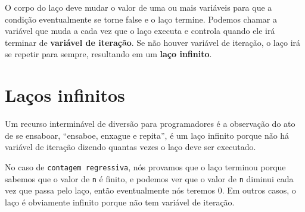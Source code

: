

O corpo do laço deve mudar o valor de uma ou mais variáveis para que a
condição eventualmente se torne false e o laço termine. Podemos chamar a
variável que muda a cada vez que o laço executa e controla quando ele irá
terminar de {\bf variável de iteração}. Se não houver variável de iteração,
o laço irá se repetir para sempre, resultando em um {\bf laço infinito}.

\section{Laços infinitos}


Um recurso interminável de diversão para programadores é a observação do ato
de se ensaboar, ``ensaboe, enxague e repita'', é um laço infinito porque não
há variável de iteração dizendo quantas vezes o laço deve ser executado.



No caso de {\tt contagem regressiva}, nós provamos que o laço terminou porque
sabemos que o valor de {\tt n} é finito, e podemos ver que o valor de {\tt n}
diminui cada vez que passa pelo laço, então eventualmente nós teremos 0. Em
outros casos, o laço é obviamente infinito porque não tem variável de iteração.

